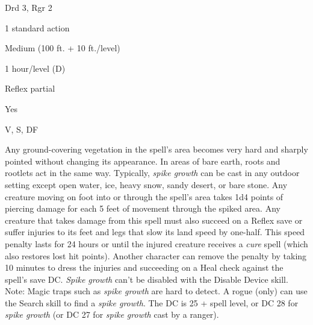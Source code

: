 
\begin{description*}
\item[Level:] Drd 3, Rgr 2
\item[Casting Time:] 1 standard action
\item[Range:] Medium (100 ft. + 10 ft./level)
\item[Duration:] 1 hour/level (D)
\item[Saving Throw:] Reflex partial
\item[Spell Resistance:] Yes
\item[Components:] V, S, DF
\end{description*}

Any ground-covering vegetation in the spell's area becomes very hard and sharply
pointed without changing its appearance.
In areas of bare earth, roots and rootlets act in the same way. Typically, \textit{spike
growth} can be cast in any outdoor setting except open water, ice, heavy snow,
sandy desert, or bare stone. Any creature moving on foot into or through the spell's
area takes 1d4 points of piercing damage for each 5 feet of movement through the
spiked area.
Any creature that takes damage from this spell must also succeed on a Reflex save
or suffer injuries to its feet and legs that slow its land speed by one-half. This
speed penalty lasts for 24 hours or until the injured creature receives a \textit{cure
}spell (which also restores lost hit points). Another character can remove the
penalty by taking 10 minutes to dress the injuries and succeeding on a Heal check
against the spell's save DC.
\textit{Spike growth} can't be disabled with the Disable Device skill.
Note: Magic traps such as \textit{spike growth} are hard to detect. A
rogue (only) can use the Search skill to find a \textit{spike growth}. The DC is
25 + spell level, or DC 28 for \textit{spike growth} (or DC 27 for \textit{spike
growth} cast by a ranger).